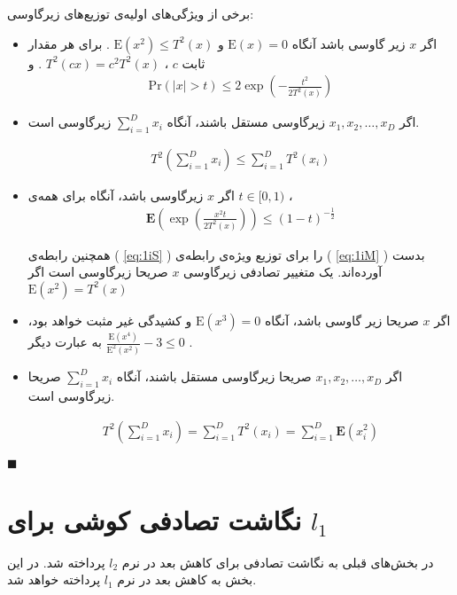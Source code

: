 برخی از ویژگی‌های اولیه‌ی توزیع‌های زیرگاوسی:

\begin{itemize}
\item
اگر 
$x$
زیر گاوسی باشد آنگاه 
$\mathrm{E}(x) = 0$
و 
$\mathrm{E}(x^2) \leq T^2(x)$
. برای هر مقدار ثابت 
$c$
، 
$T^2(cx) = c^2T^2(x)$
. و
\begin{align}
\mathrm{Pr}(|x| > t) \leq 2 \exp \left( - \frac{t^2}{2T^2(x)} \right)
\label{eq:1iQ}
\end{align}
\item
اگر 
$x_1, x_2, \ldots, x_D$
زیرگاوسی مستقل باشند، آنگاه
$\sum_{i=1}^D x_i$
زیرگاوسی است.

\begin{align}
T^2 \left( \sum_{i=1}^D x_i \right) \leq \sum_{i=1}^D T^2(x_i)
\label{eq:1iR.0}
\end{align}
\item
اگر 
$x$
زیرگاوسی باشد، آنگاه برای همه‌ی 
$t \in [0,1)$
،
\begin{align}
\mathbf{E} \left( \exp \left( \frac{x^2 t}{2 T^2(x)} \right) \right) \leq (1-t)^{- \frac{1}{2}}
\label{eq:1iS}
\end{align}

\cite{litez2, litez3}
همچنین رابطه‌ی (%
\ref{eq:1iS}%
) را برای توزیع ویژه‌ی رابطه‌ی (%
\ref{eq:1iM}%
) بدست آورده‌اند. یک متغییر تصادفی زیرگاوسی
$x$
صریحا زیرگاوسی است اگر 
$\mathrm{E}(x^2) = T^2(x)$
\item
اگر 
$x$
صریحا زیر گاوسی باشد، آنگاه 
‌$\mathrm{E}(x^3)=0$
و کشیدگی%
غیر مثبت خواهد بود، به عبارت دیگر 
$\frac{\mathrm{E}(x^4)}{\mathrm{E}^2(x^2)} - 3 \leq 0$
.
\item
اگر
$x_1, x_2, \ldots, x_D$
صریحا زیرگاوسی مستقل باشند، آنگاه
$\sum_{i=1}^D x_i$
صریحا زیرگاوسی است.

\begin{align}
T^2 \left( \sum_{i=1}^D x_i \right) = \sum_{i=1}^D T^2(x_i)
= \sum_{i=1}^D \mathbf{E} \left( x_i^2 \right)
\label{eq:1iR.1}
\end{align}
\end{itemize}

$\blacksquare$
\bigskip


\section{
نگاشت تصادفی کوشی برای 
$l_1$
}
در بخش‌های قبلی به نگاشت تصادفی برای کاهش بعد در نرم 
$l_2$
پرداخته شد. در این بخش به کاهش بعد در نرم
$l_1$
پرداخته خواهد شد. 

